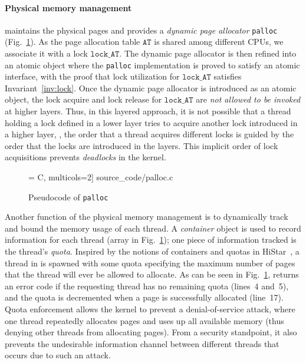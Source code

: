 \vspace{-3pt}
\paragraph{Physical memory management}
\label{sec:base:memm}
maintains the physical pages and provides a \emph{dynamic page allocator}
\texttt{palloc} (\cf Fig.~\ref{fig:exp:palloc}).
As the page allocation table $\texttt{AT}$ is shared among different CPUs, 
we associate it with a lock $\texttt{lock\_AT}$.
The dynamic page allocator is then refined into an atomic object where
the \texttt{palloc} implementation is proved to satisfy an atomic interface,
with the proof that
lock utilization for $\texttt{lock\_AT}$ satisfies Invariant~\ref{inv:lock}.
Once the dynamic page allocator is introduced as
 an atomic object, the lock acquire and lock release 
for $\texttt{lock\_AT}$
are \emph{not allowed to be invoked} at higher layers. 
Thus, in this layered approach, it is not possible
that a thread holding a lock defined in a lower layer tries to acquire another lock
introduced in a higher layer, \ie, the order that a thread acquires different
locks is guided by the order that the locks are introduced in the layers.
This implicit order of lock acquisitions prevents \emph{deadlocks} in the
{\mCTOS} kernel.

\begin{figure}
 = C, multicols=2] {source_code/palloc.c}
\vspace{-5pt}
\caption{Pseudocode of \texttt{palloc}}
\label{fig:exp:palloc}
\vspace{-10pt}
\end{figure}



Another function of the physical memory management is to dynamically
track and bound the memory usage of each thread. A \emph{container}
object is used to record information for each thread (array 
in Fig.~\ref{fig:exp:palloc}); one piece of information tracked is the
thread's \emph{quota}. Inspired by the notions of containers and
quotas in HiStar~\cite{zeldovich06}, a thread
in {\mCTOS} is spawned with some quota specifying the maximum number
of pages that the thread will ever be allowed to allocate. As can be
seen in Fig.~\ref{fig:exp:palloc},  returns an error
code if the requesting thread has no remaining quota (lines~4 and~5), 
and the quota is decremented when a page is successfully allocated (line~17).
Quota enforcement allows the kernel to prevent a denial-of-service attack,
where one thread repeatedly allocates pages and uses up all available
memory (thus denying other threads from allocating pages). From a security
standpoint, it also prevents the undesirable information channel between 
different threads that occurs due to such an attack.


